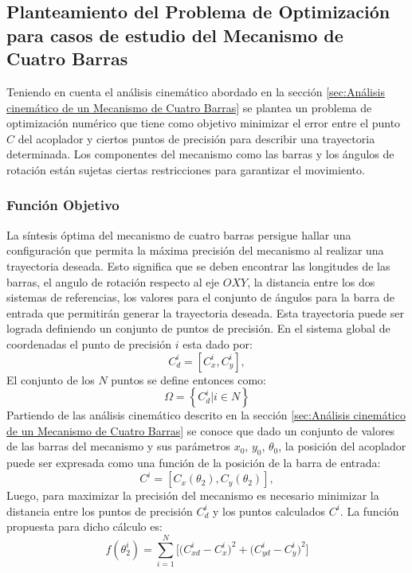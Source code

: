 \subsection{Planteamiento del Problema de Optimización para casos de estudio del Mecanismo de Cuatro Barras}
Teniendo en cuenta el análisis cinemático abordado en la sección \ref{sec:Análisis cinemático de un Mecanismo de Cuatro Barras} se plantea un problema de optimización numérico que tiene como objetivo minimizar el error entre el punto $C$ del acoplador y ciertos puntos de precisión para describir una trayectoria determinada. Los componentes del mecanismo como las  barras y los ángulos de rotación están sujetas ciertas restricciones para garantizar el movimiento. 

\subsubsection{Función Objetivo}\label{sec:Funcion Objetivo de MEC}
La síntesis óptima del mecanismo de cuatro barras persigue hallar una configuración que permita la máxima precisión del mecanismo al realizar una trayectoria deseada. Esto significa que se deben encontrar las longitudes de las barras, el angulo de rotación respecto al eje $OXY$, la distancia entre los dos sistemas de referencias, los valores para el conjunto de ángulos para la barra de entrada que permitirán generar la trayectoria deseada. Esta trayectoria puede ser lograda definiendo un conjunto de puntos de precisión. En el sistema global de coordenadas el punto de precisión $i$ esta dado por:
\begin{equation}
C^i_d=\left[C^i_x,C^i_y \right],
\end{equation}
El conjunto de los $N$ puntos se define entonces como:
\begin{equation}
\Omega=\left \{ C^i_d | i \in N \right \}
\end{equation}
Partiendo de las análisis cinemático descrito en la sección \ref{sec:Análisis cinemático de un Mecanismo de Cuatro Barras} se conoce que dado un conjunto de valores de las barras del mecanismo y sus parámetros $x_0$, $y_0$, $\theta_0$, la posición del acoplador puede ser expresada como una función de la posición de la barra de entrada: 
\begin{equation}
C^i=\left[C_x\left(\theta_2\right),C_y\left(\theta_2 \right) \right],
\end{equation}
Luego, para maximizar la precisión del mecanismo es necesario minimizar la distancia entre los puntos de precisión $C^i_d$ y los puntos calculados $C^i$. La función propuesta para dicho cálculo es:
\begin{equation}
f(\theta^i_2)= \sum_{i=1}^{N} \big[\big(C^{i}_{xd}-C^{i}_{x} \big)^2 +\big(C^{i}_{yd}-C^{i}_{y} \big)^2\big]
\end{equation}
